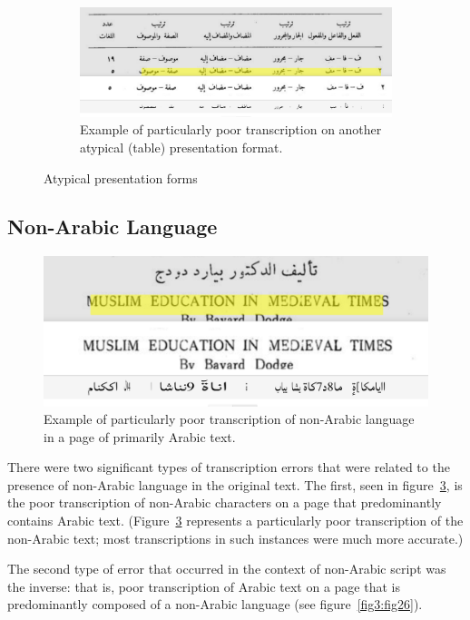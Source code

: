 \begin{figure}[h]
\begin{subfigure}[t]{0.48\linewidth}
	\centering
	\includegraphics[width=\textwidth]{images/image11.png}
	\caption{Example of particularly poor transcription on another atypical (table) presentation format.}
	\label{fig3:fig24}
	\end{subfigure}
	\caption{Atypical presentation forms}
	\label{fig3:fig2124}
\end{figure}

\subsection{Non-Arabic Language}

\begin{figure}
	\centering
	\includegraphics[width=0.9\linewidth]{images/image12.png}
	\caption{Example of particularly poor transcription of non-Arabic language in a page of primarily Arabic text.}
	\label{fig3:fig25}
\end{figure}

There were two significant types of transcription errors that were related to
the presence of non-Arabic language in the original text. The first, seen in
figure~\ref{fig3:fig25}, is the poor transcription of non-Arabic characters on a
page that predominantly contains Arabic text. (Figure~\ref{fig3:fig25}
represents a particularly poor transcription of the non-Arabic text; most
transcriptions in such instances were much more accurate.)
  
The second type of error that occurred in the context of non-Arabic script was
the inverse: that is, poor transcription of Arabic text on a page that is
predominantly composed of a non-Arabic language (see figure~\ref{fig3:fig26}). 

